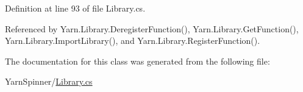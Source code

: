 Definition at line 93 of file Library.\-cs.



Referenced by Yarn.\-Library.\-Deregister\-Function(), Yarn.\-Library.\-Get\-Function(), Yarn.\-Library.\-Import\-Library(), and Yarn.\-Library.\-Register\-Function().



The documentation for this class was generated from the following file\-:\begin{DoxyCompactItemize}
\item 
Yarn\-Spinner/\hyperlink{a00290}{Library.\-cs}\end{DoxyCompactItemize}
